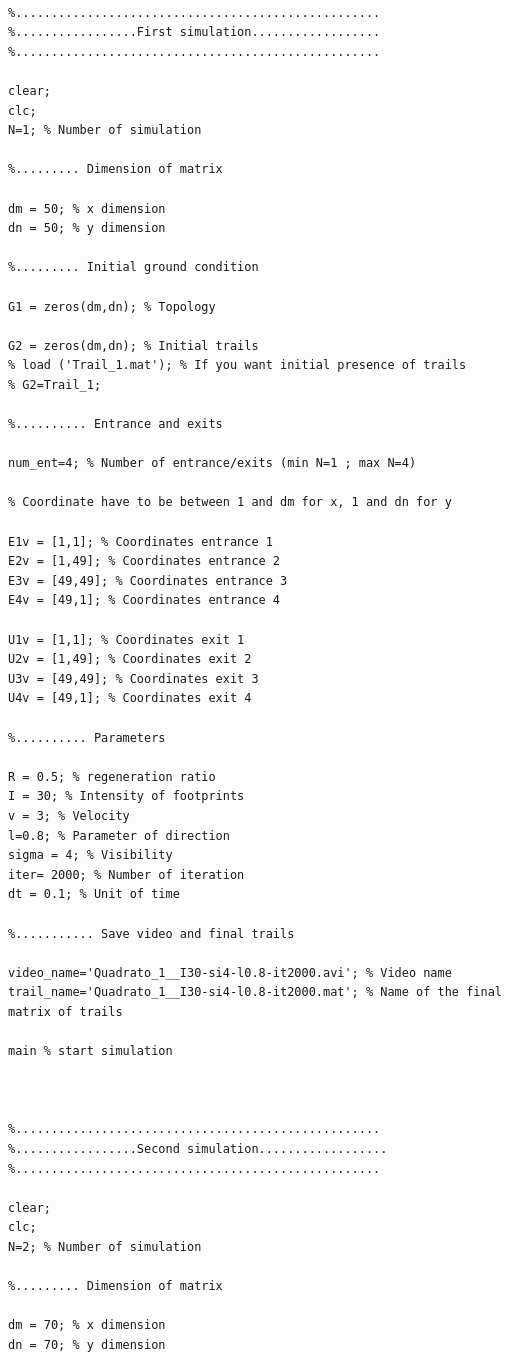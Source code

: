 \documentclass[11pt]{article}
\begin{document}
\begin{lstlisting}

%...................................................
%.................First simulation..................
%...................................................

clear;
clc;
N=1; % Number of simulation

%......... Dimension of matrix

dm = 50; % x dimension
dn = 50; % y dimension

%......... Initial ground condition

G1 = zeros(dm,dn); % Topology

G2 = zeros(dm,dn); % Initial trails
% load ('Trail_1.mat'); % If you want initial presence of trails
% G2=Trail_1;

%.......... Entrance and exits

num_ent=4; % Number of entrance/exits (min N=1 ; max N=4)

% Coordinate have to be between 1 and dm for x, 1 and dn for y

E1v = [1,1]; % Coordinates entrance 1
E2v = [1,49]; % Coordinates entrance 2
E3v = [49,49]; % Coordinates entrance 3
E4v = [49,1]; % Coordinates entrance 4

U1v = [1,1]; % Coordinates exit 1
U2v = [1,49]; % Coordinates exit 2
U3v = [49,49]; % Coordinates exit 3
U4v = [49,1]; % Coordinates exit 4

%.......... Parameters

R = 0.5; % regeneration ratio
I = 30; % Intensity of footprints
v = 3; % Velocity
l=0.8; % Parameter of direction
sigma = 4; % Visibility
iter= 2000; % Number of iteration
dt = 0.1; % Unit of time

%........... Save video and final trails

video_name='Quadrato_1__I30-si4-l0.8-it2000.avi'; % Video name
trail_name='Quadrato_1__I30-si4-l0.8-it2000.mat'; % Name of the final matrix of trails

main % start simulation



%...................................................
%.................Second simulation..................
%...................................................

clear;
clc;
N=2; % Number of simulation

%......... Dimension of matrix

dm = 70; % x dimension
dn = 70; % y dimension


\end{lstlisting}
\end{document}
